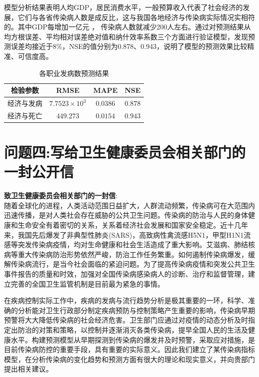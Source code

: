 \documentclass{whutmod}
\begin{document}
     模型分析结果表明人均GDP，居民消费水平，一般预算收入代表了社会经济的发展，它们与各省传染病人数是成反比，这与我国各地经济与传染病实际情况实相符的。其中GDP每增加一亿元 ， 传染病人数就减少200人左右。通过对预测结果从均方根误差、平均相对误差绝对值和纳什效率系数三个方面进行验证模型，发现预测误差均接近于8\%，NSE的值分别为0.878、0.943，说明了模型的预测效果比较精准、可信度高。
     \begin{table}[H]
     	\centering\caption{各职业发病数预测结果}\label{zhiye1}
     	\begin{tabular}{cccc}
     		\toprule[1.5pt]
     		\multicolumn{1}{m{2cm}}{\centering 检验参数}
     		& \multicolumn{1}{m{1.8cm}}{\centering RMSE}
     		& \multicolumn{1}{m{1.8cm}}{\centering MAPE}
     		& \multicolumn{1}{m{1.8cm}}{\centering NSE}
     		\\
     		\midrule[0.5pt]	
     		经济与发病 &  $7.7523\times10^{3}$&$0.0386$&$0.878$
     		\\ 
     		经济与死亡 &  $449.273$&$0.0154$&$0.943$\\
     		\bottomrule[1.5pt]	
     	\end{tabular}
     \end{table}
     

     
    \section{问题四:写给卫生健康委员会相关部门的一封公开信}
    \textbf{致卫生健康委员会相关部门的一封信}:
    ~\\
    
    随着全球化的进程，人类活动范围日益扩大，人群流动频繁，传染病可在大范围内迅速传播，是对人类社会存在威胁的公共卫生问题。传染病的防治与人民的身体健康和生命安全有着密切的关系，关系着经济社会发展和国家安全稳定。近十几年来，我国先后爆发了非典型性肺炎(SARS)，高致病性禽流感H5N1，甲型H1N1流感等突发传染病疫情，均对生命健康和社会生活造成了重大影响。艾滋病、肺结核病等重大传染病防治形势依然严峻，防治工作任务繁重。如何遏制传染病爆发，缓解传染病流行，是当今社会面临的紧迫问题。为了提高传染病疫情和突发公共卫生事件报告的质量和时效，加强对全国传染病感染病人的诊断、治疗和监督管理，建立完善的全国卫生监管机制是目前最为紧急的事情。
    
    在疾病控制实际工作中，疾病的发病与流行趋势分析是极其重要的一环，科学、准确的分析能对卫生行政部分制定疾病预防与控制策略产生重要的影响，传染病早期预警将大大降低传染病的社会经济危害。卫生部门应通过对疫情的动态分析及时指定出防治的对策和策略，以控制并逐渐消灭各类传染病，提早全国人民的生活及健康水平。构建预测模型从早期探测到传染病的爆发并及时预警，采取应对措施，是目前传染病防控的重要手段，具有重要的实际意义。因此我们建立了某传染病指标模型，在分析传染病的变化趋势和预测方面有很大的理论和现实意义，并向贵部门提出相关建议。
    
\end{document}
